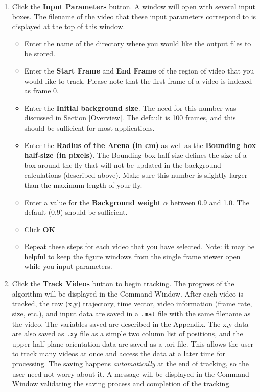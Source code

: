 \documentclass[letterpaper, 11pt]{article}
\begin{document}
\begin{enumerate}
\item Click the \textbf{Input Parameters} button.  A window will open with several input boxes.  The filename of the video that
these input parameters correspond to is displayed at the top of this window.
\begin{itemize}
\item Enter the name of the directory where you would like the output files to be stored.
\item Enter the \textbf{Start Frame} and \textbf{End Frame} of the region of video that you would
like to track. Please note that the first frame of a video is indexed as frame 0.
\item Enter the \textbf{Initial background size}.  The need for this number was
discussed in Section \ref{Overview}.  The default is 100 frames, and this should be sufficient for
most applications.
\item Enter the \textbf{Radius of the Arena (in cm)} as well as the \textbf{Bounding box half-size (in
pixels)}.  The Bounding box half-size defines the size of a box
around the fly that will not be updated in the background
calculations (described above).  Make sure this number is slightly
larger than the maximum length of your fly.
\item Enter a value for the \textbf{Background weight} $\alpha$ between 0.9 and 1.0.  The
default (0.9) should be sufficient.
\item Click \textbf{OK}
\item Repeat these steps for each video that you have selected.  Note: it may be helpful to keep
the figure windows from the single frame viewer open while you input parameters.
\end{itemize}



\item Click the \textbf{Track Videos} button to begin tracking.  The progress of the algorithm will
be displayed in the Command Window. After each video is tracked, the raw (x,y) trajectory, time
vector, video information (frame rate, size, etc.), and input data are saved in a \texttt{.mat}
file with the same filename as the video.  The variables saved are described in the Appendix. The
x,y data are also saved as \texttt{.xy} file as a simple two column list of positions, and the
upper half plane orientation data are saved as a .ori file. This allows the user to track many
videos at once and access the data at a later time for processing. The saving happens
\emph{automatically} at the end of tracking, so the user need not worry about it.  A message will
be displayed in the Command Window validating the saving process and completion of the tracking.



\end{enumerate}
\end{document}
